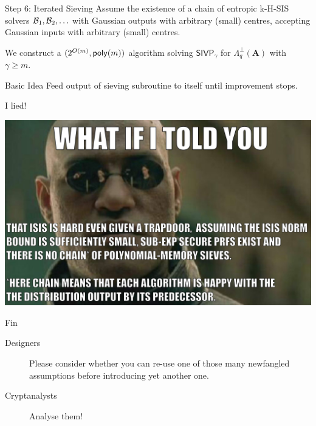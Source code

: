 \documentclass[xcolor=table,10pt,aspectratio=169]{beamer}
\renewcommand{\vec}[1]{\ensuremath{\mathbf{#1}}\xspace}
\providecommand{\mat}[1]{\ensuremath{\vec{#1}}\xspace}
\newcommand{\SIVP}{\ensuremath{\mathsf{SIVP}}\xspace}
\begin{document}
\begin{frame}[label={sec:org07d25a6}]{Step 6: Iterated Sieving}
Assume the existence of a chain of entropic k-H-SIS solvers \(\mathcal{B}_1, \mathcal{B}_2, \ldots\) with Gaussian outputs with arbitrary (small) centres, accepting Gaussian inputs with arbitrary (small) centres.

We construct a \((2^{O(m)}, \poly[m])\) algorithm solving \(\SIVP_\gamma\) for \(\Lambda_q^\bot(\mat{A})\) with \(\gamma \geq m\).

\begin{block}{Basic Idea}
Feed output of sieving subroutine to itself until improvement stops.
\end{block}
\end{frame}

\begin{frame}[label={sec:org5648a77}]{I lied!}
\begin{center}
\includegraphics[keepaspectratio,height=.9\textheight]{./sis-with-hints-real.jpg}
\end{center}
\end{frame}

\begin{frame}[label={sec:org48eaa1e},standout]{Fin}
\begin{center}
\huge

\begin{description}
\item[{Designers}] Please consider whether you can re-use one of those many newfangled assumptions before introducing yet another one.

\item[{Cryptanalysts}] Analyse them!
\end{description}
\end{center}
\end{frame}
\end{document}
